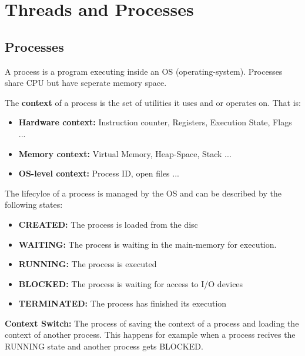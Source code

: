 \section{Threads and Processes}

\subsection{Processes}
\begin{definition}
    A process is a program executing inside an OS (operating-system). Processes share CPU but have seperate memory space.
\end{definition}

\begin{definition}
    The \textbf{context} of a process is the set of utilities it uses and or operates on. That is:
    \begin{itemize}
        \item \textbf{Hardware context: }Instruction counter, Registers, Execution State, Flags ...
        \item \textbf{Memory context: }Virtual Memory, Heap-Space, Stack ...
        \item \textbf{OS-level context:} Process ID, open files ...
    \end{itemize}
\end{definition}

The lifecylce of a process is managed by the OS and can be described by the following states:
\begin{itemize}
    \item \textbf{CREATED: }The process is loaded from the disc
    \item \textbf{WAITING: }The process is waiting in the main-memory for execution.
    \item \textbf{RUNNING: }The process is executed
    \item \textbf{BLOCKED: }The process is waiting for access to I/O devices
    \item \textbf{TERMINATED: }The process has finished its execution
\end{itemize}

\begin{definition}
    \textbf{Context Switch:} The process of saving the context of a process and loading the context of another process. This happens for example when a process recives the RUNNING state and another process gets BLOCKED.
\end{definition}

